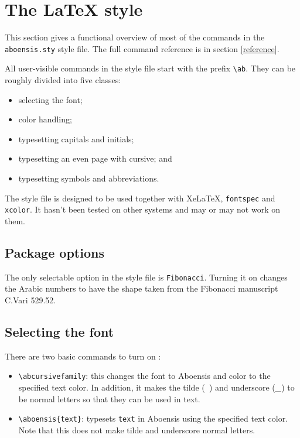 \documentclass[a4paper]{article}
\newcommand{\package}[1]{\texttt{#1}}
\newcommand{\feature}[1]{\texttt{#1}}
\newcommand{\ltxncmd}[1]{\texttt{\textbackslash{}#1}}
\newcommand{\ltxcmd}[2]{\texttt{\textbackslash{}#1\{#2\}}}
\begin{document}
\section{The LaTeX style}\label{sec_latex_style}

This section gives a functional overview of most of the commands in
the \package{aboensis.sty} style file. The full command reference is
in section \ref{reference}. 

All user-visible commands in the style file start with the prefix
\ltxncmd{ab}. They can be roughly divided into five classes:

\begin{itemize}
\item selecting the font;
\item color handling;
\item typesetting capitals and initials;
\item typesetting an even page with cursive; and
\item typesetting symbols and abbreviations. 
\end{itemize}

The style file is designed to be used together with XeLaTeX,
\package{fontspec} and \package{xcolor}. It hasn't been tested on
other systems and may or may not work on them.

\subsection{Package options}

The only selectable option in the style file is \feature{Fibonacci}.
Turning it on changes the Arabic numbers to have the shape taken from
the Fibonacci manuscript C.Vari 529.52. 

\subsection{Selecting the font}

There are two basic commands to turn on \Aboensis{}: 

\begin{itemize}
\item \ltxncmd{abcursivefamily}: this changes the font to Aboensis and
  color to the specified text color. In addition, it makes the tilde
  (\emph{~}) and underscore (\emph{_}) to be normal letters so that
  they can be used in text.

\item \ltxcmd{aboensis}{text}: typesets \package{text} in Aboensis
  using the specified text color. Note that this does not make tilde
  and underscore normal letters.
\end{itemize}
\end{document}
